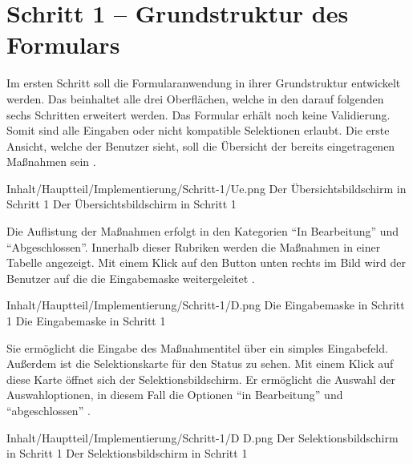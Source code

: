 \chapter{Schritt 1 -- Grundstruktur des Formulars}
\label{chap:Schritt-1}

Im ersten Schritt soll die Formularanwendung in ihrer Grundstruktur entwickelt werden.
 Das beinhaltet alle drei Oberflächen, welche in den darauf folgenden sechs Schritten erweitert werden.
 Das Formular erhält noch keine  Validierung.
 Somit sind alle Eingaben oder nicht kompatible Selektionen erlaubt.
 Die erste Ansicht, welche der Benutzer sieht, soll die Übersicht der bereits eingetragenen Maßnahmen sein \Abb{\ref{fig:Schritt1Uebersicht}}.
 
\begin{alexfigure}{Inhalt/Hauptteil/Implementierung/Schritt-1/Ue.png}
  {Der Übersichtsbildschirm in Schritt 1}
  {Der Übersichtsbildschirm in Schritt 1}

  \label{fig:Schritt1Uebersicht}

\end{alexfigure}

Die Auflistung der Maßnahmen erfolgt in den Kategorien \enquote{In Bearbeitung} und \enquote{Abgeschlossen}.
Innerhalb dieser Rubriken werden die Maßnahmen in einer Tabelle angezeigt.
Mit einem Klick auf den Button unten rechts im Bild wird der Benutzer auf die die Eingabemaske weitergeleitet \Abb{\ref{fig:Schritt1Eingabemaske}}.

\begin{alexfigure}{Inhalt/Hauptteil/Implementierung/Schritt-1/D.png}
  {Die Eingabemaske in Schritt 1}
  {Die Eingabemaske in Schritt 1}

  \label{fig:Schritt1Eingabemaske}

\end{alexfigure}

Sie ermöglicht die Eingabe des Maßnahmentitel über ein simples Eingabefeld.
Außerdem ist die Selektionskarte für den Status zu sehen.
Mit einem Klick auf diese Karte öffnet sich der Selektionsbildschirm.
Er ermöglicht die Auswahl der Auswahloptionen, in diesem Fall die Optionen \enquote{in Bearbeitung} und \enquote{abgeschlossen}
\Abb{\ref{fig:Schritt1SelektionsBildschirmStatus}}.

\begin{alexfigure}{Inhalt/Hauptteil/Implementierung/Schritt-1/D D.png}
  {Der Selektionsbildschirm in Schritt 1}
  {Der Selektionsbildschirm in Schritt 1}

  \label{fig:Schritt1SelektionsBildschirmStatus}

\end{alexfigure}

